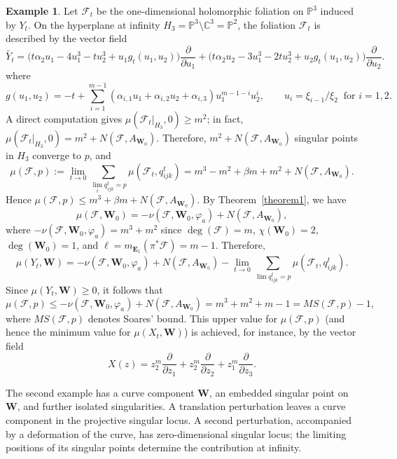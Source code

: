 \documentclass[10pt,twoside]{amsart}
\numberwithin{equation}{section}
\theoremstyle{definition}
\newtheorem{example}[proposition]{Example}
\theoremstyle{remark}
\newcommand{\C}{\mathbb{C}}
\newcommand{\fol}{\mathcal{F}}
\newcommand{\W}{\mathbf{W}}
\newcommand{\E}{\mathbf{E}}
\begin{document}
\begin{example}
Let $\fol_t$ be the one-dimensional holomorphic foliation on $\mathbb{P}^3$ induced by $Y_t$.
On the hyperplane at infinity $H_3=\mathbb{P}^3\setminus\C^3=\mathbb{P}^2$, the foliation $\fol_t$ is described by the vector field
\[
\widetilde{Y_t}
=\bigl(t\alpha_2u_1-4u_1^3-tu_2^3+u_1g_t(u_1,u_2)\bigr)\frac{\partial}{\partial u_1}
+\bigl(t\alpha_2u_2-3u_1^3-2tu_2^3+u_2g_t(u_1,u_2)\bigr)\frac{\partial}{\partial u_2}.
\]
where
\[
g(u_1,u_2)=-t+\sum_{i=1}^{m-1}(\alpha_{i,1}u_1+\alpha_{i,2}u_2+\alpha_{i,3})u_1^{m-1-i}u_2^i,
\qquad
u_i=\xi_{i-1}/\xi_{2}\ \text{ for } i=1,2.
\]
A direct computation gives $\mu(\fol_t|_{H_3},0)\geq m^2$; in fact,
$\mu(\fol_t|_{H_3},0)=m^2+N(\fol,A_{\W_0})$. Therefore, $m^2+N(\fol,A_{\W_0})$ singular points in $H_3$ converge to $p$, and
\[
\mu(\fol,p):=\lim_{t\to0}\sum_{\lim_t q^t_{ijk}=p}\mu(\fol_t,q^t_{ijk})
=m^3-m^2+\beta m+m^2+N(\fol,A_{\W_0}).
\]
Hence $\mu(\fol,p)\leq m^3+\beta m+N(\fol,A_{\W_0})$.
By Theorem~\ref{theorem1}, we have
\[
\mu(\fol,\W_0)=-\nu(\fol,\W_0,\varphi_a)+N(\fol,A_{\W_0}),
\]
where $-\nu(\fol,\W_0,\varphi_a)=m^3+m^2$ since $\deg(\fol)=m$, $\chi(\W_0)=2$, $\deg(\W_0)=1$,
and $\ell=m_{\E_1}(\pi^*\fol)=m-1$.
Therefore,
\[
\mu(Y_t,\W)
=-\nu(\fol,\W_0,\varphi_a)+N(\fol,A_{\W_0})
-\lim_{t\to0}\sum_{\lim q^t_{ijk}=p}\mu(\fol_t,q^t_{ijk}).
\]
Since $\mu(Y_t,\W)\geq 0$, it follows that
\[
\mu(\fol,p)\leq -\nu(\fol,\W_0,\varphi_a)+N(\fol,A_{\W_0})
= m^3+m^2+m-1=MS(\fol,p)-1,
\]
where $MS(\fol,p)$ denotes Soares' bound. This upper value for $\mu(\fol,p)$ (and hence the minimum value for $\mu(X_t,\W)$)
is achieved, for instance, by the vector field
\[
X(z)=z_2^m\frac{\partial}{\partial z_1}+z_2^m\frac{\partial}{\partial z_2}+z_1^m\frac{\partial}{\partial z_3}.
\]
\end{example}


The second example has a curve component $\W$, an embedded singular point on $\W$, and further isolated singularities. A translation perturbation leaves a curve component in the projective singular locus. A second perturbation, accompanied by a deformation of the curve, has zero-dimensional singular locus; the limiting positions of its singular points determine the contribution at infinity.
\end{document}

